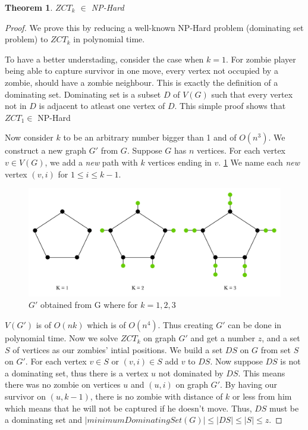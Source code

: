 \documentclass[1p]{elsarticle}
\newtheorem{theorem}{Theorem}
\begin{document}
	\begin{theorem}
		$ZCT_k$ $\in$ NP-Hard
	\end{theorem}
	\begin{proof}
		We prove this by reducing a well-known NP-Hard problem (dominating set problem) to $ZCT_k$ in polynomial time.

		To have a better understading, consider the case when $k=1$. For zombie player being able to capture survivor in
		one move, every vertex not occupied by a zombie, should have a zombie neighbour. This is exactly the definition
		of a dominating set. Dominating set is a subset $D$ of $V(G)$ such that every vertex not in $D$ is adjacent to
		atleast one vertex of $D$. This simple proof shows that $ZCT_1 \in$ NP-Hard 

		Now consider $k$ to be an arbitrary number bigger than 1 and of $O(n^3)$. We construct a new graph $G'$ from
		$G$. Suppose $G$ has $n$ vertices. For each vertex $v \in V(G)$, we add a {\it new} path with $k$ vertices
		ending in $v$. \ref{fig:p7} We name each {\it new} vertex $(v,i)$ for $1 \leq i \leq k - 1$.
		
		\begin{figure}[h!]
			\centering
			\includegraphics[width=0.9\linewidth]{fig/ZCT.png}
			\caption{$G'$ obtained from G where for $k = 1,2,3$}
			\label{fig:p7}
		\end{figure}		


		$V(G')$ is of $O(nk)$ which is of $O(n^4)$. Thus creating $G'$ can be done in polynomial time. Now we solve
		$ZCT_k$ on graph $G'$ and get a number $z$, and a set $S$ of vertices as our zombies' intial positions. We build
		a set $DS$ on $G$ from set $S$ on $G'$. For each vertex $v \in S$ or $(v,i) \in S$ add $v$ to $DS$. Now suppose
		$DS$ is not a dominating set, thus there is a vertex $u$ not dominated by $DS$. This means there was no zombie
		on vertices $u$ and $(u,i)$ on graph $G'$. By having our survivor on $(u,k-1)$, there is no zombie with distance
		of $k$ or less from him which means that he will not be captured if he doesn't move. Thus, $DS$ must be a
		dominating set and $ |minimumDominatingSet(G)| \leq |DS| \leq |S| \leq z$.


\end{proof}
\end{document}
